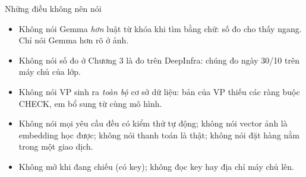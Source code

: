 \begin{note}[warn]{Những điều không nên nói}
\begin{itemize}
\item Không nói Gemma \emph{hơn} luật từ khóa khi tìm bằng chữ: số đo cho thấy ngang. Chỉ nói Gemma hơn rõ ở ảnh.
\item Không nói số đo ở Chương 3 là đo trên DeepInfra: chúng đo ngày 30/10 trên máy chủ của lớp.
\item Không nói VP sinh ra \emph{toàn bộ} cơ sở dữ liệu: bản của VP thiếu các ràng buộc CHECK, em bổ sung từ cùng mô hình.
\item Không nói mọi yêu cầu đều có kiểm thử tự động; không nói vector ảnh là embedding học được; không nói thanh toán là thật; không nói đặt hàng nằm trong một giao dịch.
\item Không mở  khi đang chiếu (có key); không đọc key hay địa chỉ máy chủ lên.
\end{itemize}
\end{note}
